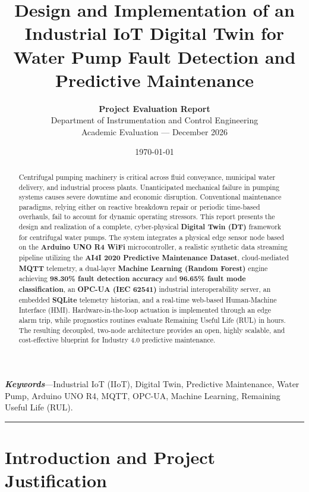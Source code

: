 \documentclass[11pt,a4paper]{article}
\title{\textbf{\LARGE Design and Implementation of an Industrial IoT Digital Twin for Water Pump Fault Detection and Predictive Maintenance}}
\author{
    \textbf{Project Evaluation Report} \\
    Department of Instrumentation and Control Engineering \\
    Academic Evaluation --- December 2026
}
\date{\today}
\begin{document}
\maketitle
\thispagestyle{empty}

\begin{abstract}
Centrifugal pumping machinery is critical across fluid conveyance, municipal water delivery, and industrial process plants. Unanticipated mechanical failure in pumping systems causes severe downtime and economic disruption. Conventional maintenance paradigms, relying either on reactive breakdown repair or periodic time-based overhauls, fail to account for dynamic operating stressors. This report presents the design and realization of a complete, cyber-physical \textbf{Digital Twin (DT)} framework for centrifugal water pumps. The system integrates a physical edge sensor node based on the \textbf{Arduino UNO R4 WiFi} microcontroller, a realistic synthetic data streaming pipeline utilizing the \textbf{AI4I 2020 Predictive Maintenance Dataset}, cloud-mediated \textbf{MQTT} telemetry, a dual-layer \textbf{Machine Learning (Random Forest)} engine achieving \textbf{98.30\% fault detection accuracy} and \textbf{96.65\% fault mode classification}, an \textbf{OPC-UA (IEC 62541)} industrial interoperability server, an embedded \textbf{SQLite} telemetry historian, and a real-time web-based Human-Machine Interface (HMI). Hardware-in-the-loop actuation is implemented through an edge alarm trip, while prognostics routines evaluate Remaining Useful Life (RUL) in hours. The resulting decoupled, two-node architecture provides an open, highly scalable, and cost-effective blueprint for Industry 4.0 predictive maintenance.
\end{abstract}

\textbf{\textit{Keywords}}---Industrial IoT (IIoT), Digital Twin, Predictive Maintenance, Water Pump, Arduino UNO R4, MQTT, OPC-UA, Machine Learning, Remaining Useful Life (RUL).

\vspace{0.8em}
\hrule
\vspace{0.8em}

\section{Introduction and Project Justification}
\end{document}
